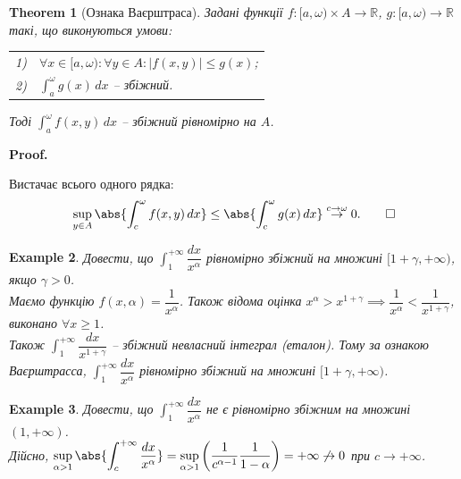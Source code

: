 \documentclass[a4paper, 10pt]{article}
\makeatletter
\def\huge{\displaystyle}
\theoremstyle{theoremdd}
\newtheorem{theorem}{Theorem}[subsection]
\theoremstyle{theoremdd}
\theoremstyle{theoremdd}
\theoremstyle{theoremdd}
\theoremstyle{theoremdd}
\newtheorem{example}[theorem]{Example}
\theoremstyle{theoremdd}
\theoremstyle{theoremdd}
\theoremstyle{theoremdd}
\theoremstyle{theoremdd}
\renewenvironment{proof}[1][Proof.\\]{\par
\pushQED{\hfill \qed}%
\normalfont \topsep6\p@\@plus6\p@\relax
\trivlist
\item\relax
{\bfseries
#1\@addpunct{.}}\hspace\labelsep\ignorespaces
}{%
\popQED\endtrivlist\@endpefalse
}
\makeatother
\begin{document}
\begin{theorem}[Ознака Ваєрштраса]
Задані функції $f \colon [a,\omega) \times A \to \mathbb{R}$, $g \colon [a,\omega) \to \mathbb{R}$ такі, що виконуються умови:
\begin{center}
\begin{tabular}{ll}
1) & $\forall x \in [a,\omega): \forall y \in A: |f(x,y)| \leq g(x)$; \\
2) & $\displaystyle \int_a^\omega g(x)\,dx$ -- збіжний.
\end{tabular}
\end{center}
Тоді $\huge \int_a^\omega f(x,y)\,dx$ -- збіжний рівномірно на $A$.
\end{theorem}

\begin{proof}
Вистачає всього одного рядка:
\[
\sup_{y \in A} \abs{\int_c^\omega f(x,y)\,dx} \leq \abs{\int_c^\omega g(x)\,dx} \overset{c \to \omega}{\to} 0. \qedhere
\]
\end{proof}

\begin{example}
Довести, що $\huge\int_1^{+\infty} \dfrac{dx}{x^\alpha}$ рівномірно збіжний на множині $[1+\gamma,+\infty)$, якщо $\gamma > 0$.\\
Маємо функцію $f(x,\alpha) = \dfrac{1}{x^\alpha}$. Також відома оцінка $x^\alpha > x^{1+\gamma} \implies \dfrac{1}{x^\alpha} < \dfrac{1}{x^{1+\gamma}}$, виконано $\forall x \geq 1$.\\
Також $\huge\int_1^{+\infty} \dfrac{dx}{x^{1+\gamma}}$ -- збіжний невласний інтеграл (еталон). Тому за ознакою Ваєрштрасса, $\huge\int_1^{+\infty} \dfrac{dx}{x^\alpha}$ рівномірно збіжний на множині $[1+\gamma,+\infty)$.
\end{example}

\begin{example}
Довести, що $\huge\int_1^{+\infty} \dfrac{dx}{x^\alpha}$ не є рівномірно збіжним на множині $(1,+\infty)$.\\
Дійсно, $\huge\sup_{\alpha > 1} \abs{\int_c^{+\infty} \dfrac{dx}{x^\alpha}} = \sup_{\alpha >1} \left(\dfrac{1}{c^{\alpha-1}} \dfrac{1}{1-\alpha}\right) = +\infty \not\to 0$ при $c \to +\infty$.
\end{example}
\end{document}

